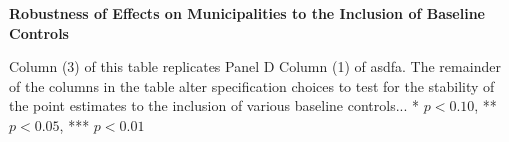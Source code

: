\documentclass{article}
\begin{document}
\begin{table}[ht]
\centering
\caption{\textbf{Robustness of Effects on Municipalities to the Inclusion of Baseline Controls}}
\begin{threeparttable}

\begin{tablenotes}\footnotesize
\item Column (3) of this table replicates Panel D Column (1) of asdfa. The remainder of the columns in the table alter specification choices to test for the stability of the point estimates  to the inclusion of various baseline controls... * \(p<0.10\), ** \(p<0.05\), *** \(p<0.01\)
\end{tablenotes}
\end{threeparttable}
\end{table}

\clearpage
\end{document}
